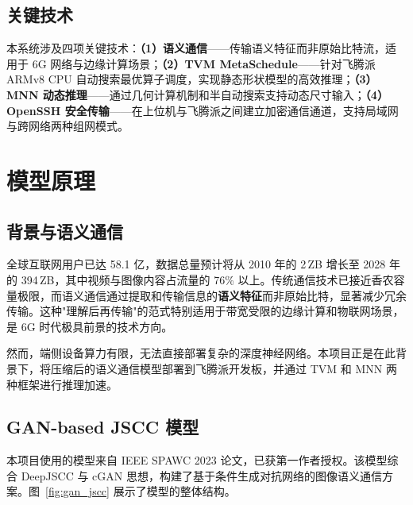 \documentclass[lang=cn,a4paper,newtx,citestyle=gb7714-2015,bibstyle=gb7714-2015]{elegantpaper}
\begin{document}
\subsection{关键技术}

本系统涉及四项关键技术：\textbf{（1）语义通信}——传输语义特征而非原始比特流，适用于 6G 网络与边缘计算场景\cite{dang6g}；\textbf{（2）TVM MetaSchedule}——针对飞腾派 ARMv8 CPU 自动搜索最优算子调度，实现静态形状模型的高效推理；\textbf{（3）MNN 动态推理}——通过几何计算机制和半自动搜索支持动态尺寸输入\cite{mnn_walle}；\textbf{（4）OpenSSH 安全传输}——在上位机与飞腾派之间建立加密通信通道，支持局域网与跨网络两种组网模式。

\section{模型原理}

\subsection{背景与语义通信}

全球互联网用户已达 58.1 亿\cite{datareportal}，数据总量预计将从 2010 年的 2\,ZB 增长至 2028 年的 394\,ZB\cite{statista}，其中视频与图像内容占流量的 76\% 以上。传统通信技术已接近香农容量极限，而语义通信通过提取和传输信息的\textbf{语义特征}而非原始比特，显著减少冗余传输\cite{semcom,popovski}。这种"理解后再传输"的范式特别适用于带宽受限的边缘计算和物联网场景，是 6G 时代极具前景的技术方向\cite{dang6g}。

然而，端侧设备算力有限，无法直接部署复杂的深度神经网络。本项目正是在此背景下，将压缩后的语义通信模型部署到飞腾派开发板，并通过 TVM 和 MNN 两种框架进行推理加速。

\subsection{GAN-based JSCC 模型}

本项目使用的模型来自 IEEE SPAWC 2023 论文\cite{lgjscc}，已获第一作者授权。该模型综合 DeepJSCC 与 cGAN 思想，构建了基于条件生成对抗网络的图像语义通信方案。图~\ref{fig:gan_jscc} 展示了模型的整体结构。
\end{document}

